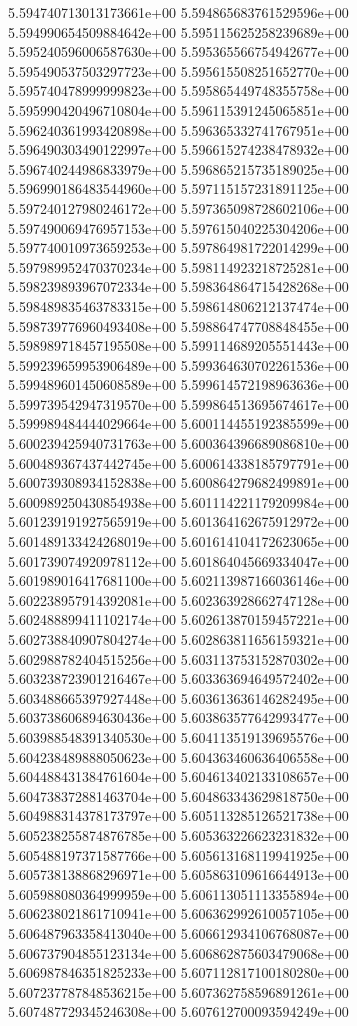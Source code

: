 5.594740713013173661e+00
5.594865683761529596e+00
5.594990654509884642e+00
5.595115625258239689e+00
5.595240596006587630e+00
5.595365566754942677e+00
5.595490537503297723e+00
5.595615508251652770e+00
5.595740478999999823e+00
5.595865449748355758e+00
5.595990420496710804e+00
5.596115391245065851e+00
5.596240361993420898e+00
5.596365332741767951e+00
5.596490303490122997e+00
5.596615274238478932e+00
5.596740244986833979e+00
5.596865215735189025e+00
5.596990186483544960e+00
5.597115157231891125e+00
5.597240127980246172e+00
5.597365098728602106e+00
5.597490069476957153e+00
5.597615040225304206e+00
5.597740010973659253e+00
5.597864981722014299e+00
5.597989952470370234e+00
5.598114923218725281e+00
5.598239893967072334e+00
5.598364864715428268e+00
5.598489835463783315e+00
5.598614806212137474e+00
5.598739776960493408e+00
5.598864747708848455e+00
5.598989718457195508e+00
5.599114689205551443e+00
5.599239659953906489e+00
5.599364630702261536e+00
5.599489601450608589e+00
5.599614572198963636e+00
5.599739542947319570e+00
5.599864513695674617e+00
5.599989484444029664e+00
5.600114455192385599e+00
5.600239425940731763e+00
5.600364396689086810e+00
5.600489367437442745e+00
5.600614338185797791e+00
5.600739308934152838e+00
5.600864279682499891e+00
5.600989250430854938e+00
5.601114221179209984e+00
5.601239191927565919e+00
5.601364162675912972e+00
5.601489133424268019e+00
5.601614104172623065e+00
5.601739074920978112e+00
5.601864045669334047e+00
5.601989016417681100e+00
5.602113987166036146e+00
5.602238957914392081e+00
5.602363928662747128e+00
5.602488899411102174e+00
5.602613870159457221e+00
5.602738840907804274e+00
5.602863811656159321e+00
5.602988782404515256e+00
5.603113753152870302e+00
5.603238723901216467e+00
5.603363694649572402e+00
5.603488665397927448e+00
5.603613636146282495e+00
5.603738606894630436e+00
5.603863577642993477e+00
5.603988548391340530e+00
5.604113519139695576e+00
5.604238489888050623e+00
5.604363460636406558e+00
5.604488431384761604e+00
5.604613402133108657e+00
5.604738372881463704e+00
5.604863343629818750e+00
5.604988314378173797e+00
5.605113285126521738e+00
5.605238255874876785e+00
5.605363226623231832e+00
5.605488197371587766e+00
5.605613168119941925e+00
5.605738138868296971e+00
5.605863109616644913e+00
5.605988080364999959e+00
5.606113051113355894e+00
5.606238021861710941e+00
5.606362992610057105e+00
5.606487963358413040e+00
5.606612934106768087e+00
5.606737904855123134e+00
5.606862875603479068e+00
5.606987846351825233e+00
5.607112817100180280e+00
5.607237787848536215e+00
5.607362758596891261e+00
5.607487729345246308e+00
5.607612700093594249e+00
